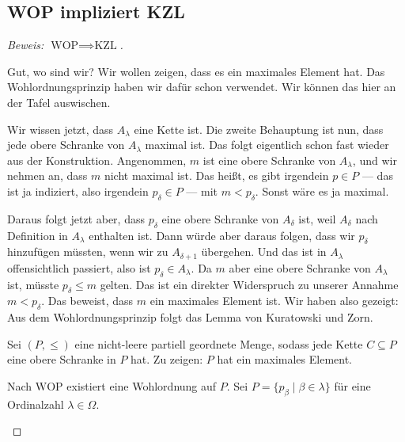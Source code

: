 \subsection{WOP impliziert KZL}

\begin{proof}[Beweis: $\text{WOP} \implies \text{KZL}$]
\begin{spoken-clean}[00:52:08 - 00:54:00]
Gut, wo sind wir? Wir wollen zeigen, dass es ein maximales Element hat. Das Wohlordnungsprinzip haben wir dafür schon verwendet. Wir können das hier an der Tafel auswischen.

Wir wissen jetzt, dass $A_\lambda$ eine Kette ist. Die zweite Behauptung ist nun, dass jede obere Schranke von $A_\lambda$ maximal ist. Das folgt eigentlich schon fast wieder aus der Konstruktion. Angenommen, $m$ ist eine obere Schranke von $A_\lambda$, und wir nehmen an, dass $m$ nicht maximal ist. Das heißt, es gibt irgendein $p \in P$ --- das ist ja indiziert, also irgendein $p_\delta \in P$ --- mit $m < p_\delta$. Sonst wäre es ja maximal.
\end{spoken-clean}

\begin{spoken-clean}[00:54:00 - 00:56:45]
Daraus folgt jetzt aber, dass $p_\delta$ eine obere Schranke von $A_\delta$ ist, weil $A_\delta$ nach Definition in $A_\lambda$ enthalten ist. Dann würde aber daraus folgen, dass wir $p_\delta$ hinzufügen müssten, wenn wir zu $A_{\delta+1}$ übergehen. Und das ist in $A_\lambda$ offensichtlich passiert, also ist $p_\delta \in A_\lambda$. Da $m$ aber eine obere Schranke von $A_\lambda$ ist, müsste $p_\delta \le m$ gelten. Das ist ein direkter Widerspruch zu unserer Annahme $m < p_\delta$. Das beweist, dass $m$ ein maximales Element ist. Wir haben also gezeigt: Aus dem Wohlordnungsprinzip folgt das Lemma von Kuratowski und Zorn.
\end{spoken-clean}

\begin{math-stroke}
Sei $(P, \le)$ eine nicht-leere partiell geordnete Menge, sodass jede Kette $C \subseteq P$ eine obere Schranke in $P$ hat.
Zu zeigen: $P$ hat ein maximales Element.

Nach $\text{WOP}$ existiert eine Wohlordnung auf $P$.
Sei $P = \{ p_\beta \mid \beta \in \lambda \}$ für eine Ordinalzahl $\lambda \in \Omega$.


\end{math-stroke}
\end{proof}
